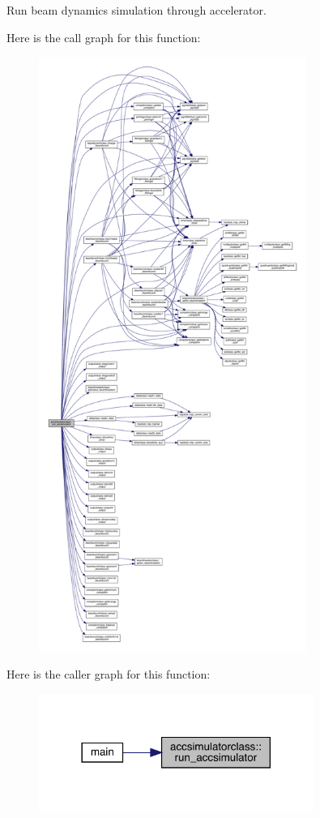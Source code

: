 Run beam dynamics simulation through accelerator. 

Here is the call graph for this function\+:\nopagebreak
\begin{figure}[H]
\begin{center}
\leavevmode
\includegraphics[height=550pt]{namespaceaccsimulatorclass_acbe26eeaf1cb4076384b90e1016785f0_cgraph}
\end{center}
\end{figure}
Here is the caller graph for this function\+:\nopagebreak
\begin{figure}[H]
\begin{center}
\leavevmode
\includegraphics[width=254pt]{namespaceaccsimulatorclass_acbe26eeaf1cb4076384b90e1016785f0_icgraph}
\end{center}
\end{figure}


